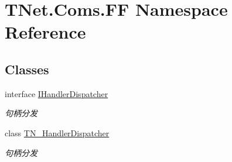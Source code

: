 \hypertarget{namespace_t_net_1_1_coms_1_1_f_f}{}\section{T\+Net.\+Coms.\+FF Namespace Reference}
\label{namespace_t_net_1_1_coms_1_1_f_f}
\subsection*{Classes}
\begin{DoxyCompactItemize}
\item 
interface \mbox{\hyperlink{interface_t_net_1_1_coms_1_1_f_f_1_1_i_handler_dispatcher}{I\+Handler\+Dispatcher}}
\begin{DoxyCompactList}\small\item\em 句柄分发 \end{DoxyCompactList}\item 
class \mbox{\hyperlink{class_t_net_1_1_coms_1_1_f_f_1_1_t_n___handler_dispatcher}{T\+N\+\_\+\+Handler\+Dispatcher}}
\begin{DoxyCompactList}\small\item\em 句柄分发 \end{DoxyCompactList}\end{DoxyCompactItemize}
